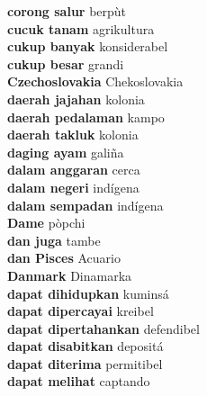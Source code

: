 \textbf{ corong salur  } berpùt \\
\textbf{ cucuk tanam  } agrikultura \\
\textbf{ cukup banyak  } konsiderabel \\
\textbf{ cukup besar  } grandi \\
\textbf{ Czechoslovakia  } Chekoslovakia \\
\textbf{ daerah jajahan  } kolonia \\
\textbf{ daerah pedalaman  } kampo \\
\textbf{ daerah takluk  } kolonia \\
\textbf{ daging ayam  } galiña \\
\textbf{ dalam anggaran  } cerca \\
\textbf{ dalam negeri  } indígena \\
\textbf{ dalam sempadan  } indígena \\
\textbf{ Dame  } pòpchi \\
\textbf{ dan juga  } tambe \\
\textbf{ dan Pisces  } Acuario \\
\textbf{ Danmark  } Dinamarka \\
\textbf{ dapat dihidupkan  } kuminsá \\
\textbf{ dapat dipercayai  } kreibel \\
\textbf{ dapat dipertahankan  } defendibel \\
\textbf{ dapat disabitkan  } depositá \\
\textbf{ dapat diterima  } permitibel \\
\textbf{ dapat melihat  } captando \\
